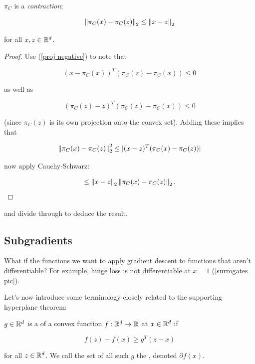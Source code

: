 \documentclass[11pt]{scrartcl}
\begin{document}
\begin{theorem}
\label{projection is contraction}
$\pi_C$ is a \textit{contraction};

\begin{equation}
    \left\lVert\pi_C(x) - \pi_C(z)\right\rVert_2 \le \left\lVert x-z\right\rVert_2
\end{equation}

for all $x,z \in \mathbb R^d$.

\begin{proof}
Use (\ref{proj negative}) to note that 

\begin{equation}
    (x - \pi_C(x))^T (\pi_C(z) - \pi_C(x)) \le 0
\end{equation}

as well as 

\begin{equation}
    (\pi_C(z) - z)^T (\pi_C(z) - \pi_C(x)) \le 0
\end{equation}

(since $\pi_C(z)$ is its own projection onto the convex set). Adding these implies that

\begin{equation}
    \left\lVert\pi_C(x) - \pi_C(z)\right\rVert_2^2 \le |(x-z)^T (\pi_C(x) - \pi_C(z))|
\end{equation}

now apply Cauchy-Schwarz:

\begin{align}
    \le \left\lVert x-z\right\rVert_2 \left\lVert\pi_C(x) - \pi_C(z)\right\rVert_2.
\end{align}
\end{proof}

and divide through to deduce the result.
\end{theorem}

\subsection{Subgradients}

What if the functions we want to apply gradient descent to functions that aren't differentiable? For example, hinge loss is not differentiable at $x=1$ (\ref{surrogates pic}).

Let's now introduce some terminology closely related to the supporting hyperplane theorem:

\begin{definition}
$g \in \mathbb R^d$ is a  of a convex function $f : \mathbb R^d \rightarrow \mathbb R$ at $x \in \mathbb R^d$ if

\begin{equation}
    f(z) - f(x) \ge g^T (z-x)
\end{equation}

for all $z \in \mathbb R^d$. We call the set of all such $g$ the , denoted $\partial f(x)$.
\end{definition}
\end{document}
